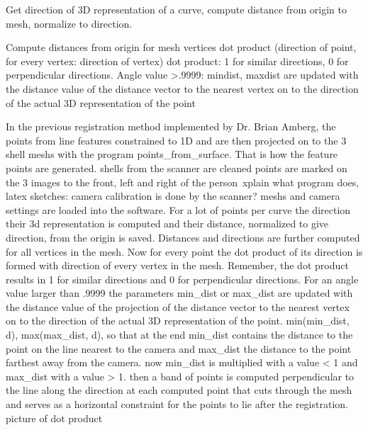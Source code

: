 Get direction of 3D representation of a curve, compute distance from origin to mesh, normalize to direction.

Compute distances from origin for mesh vertices
dot product (direction of point, for every vertex: direction of vertex) 
dot product: 1 for similar directions, 0 for perpendicular directions.
Angle value >.9999: mindist, maxdist are updated with the distance value of the distance vector to the nearest vertex on to the direction of the actual 3D representation of the point

In the previous registration method implemented by Dr. Brian Amberg, the
points from line features constrained to 1D
and are then projected on to the 3 shell meshs with the program points\_from\_surface. That is how the feature points are generated.
shells from the scanner are cleaned
points are marked on the 3 images to the front, left and right of the person\
xplain what program does, latex sketches:
camera calibration is done by the scanner?
meshs and camera settings are loaded into the software. For a lot of points per curve the direction their 3d representation is computed and their distance, normalized to give direction,  from the origin is saved. Distances and directions are further computed for all vertices in the mesh. Now for every point the dot product of its direction is formed with direction of every vertex in the mesh. Remember, the dot product results in 1 for similar directions and 0 for perpendicular directions.
For an angle value larger than .9999 the parameters min\_dist or max\_dist are updated with the distance value of the projection of the distance vector to the nearest vertex on to the direction of the actual 3D representation of the point. min(min\_dist, d), max(max\_dist, d), so that at the end min\_dist contains the distance to the point on the line nearest to the camera and max\_dist the distance to the point farthest away from the camera. now min\_dist is multiplied with a value < 1 and
max\_dist with a value > 1. 
then a band of points is computed perpendicular to the line along the direction at each computed point that cuts through the mesh and serves as a horizontal constraint for the points to lie after the registration.
picture of dot product

